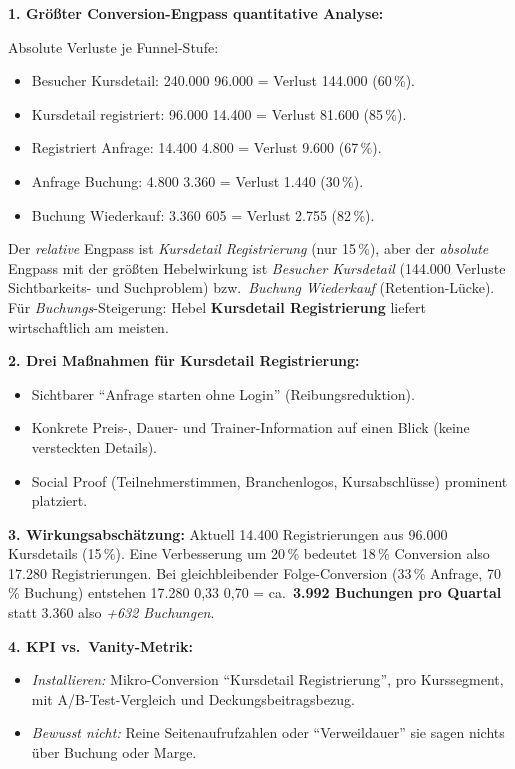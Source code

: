 \documentclass[11pt,a4paper,oneside]{article}
\begin{document}
\begin{loesungbox}
\smallskip
\textbf{1. Größter Conversion-Engpass \textendash{} quantitative Analyse:}

\smallskip
Absolute Verluste je Funnel-Stufe:
\begin{itemize}
  \item Besucher \textrightarrow{} Kursdetail: 240.000 \textrightarrow{} 96.000 = Verlust 144.000 (60\,\%).
  \item Kursdetail \textrightarrow{} registriert: 96.000 \textrightarrow{} 14.400 = Verlust 81.600 (85\,\%).
  \item Registriert \textrightarrow{} Anfrage: 14.400 \textrightarrow{} 4.800 = Verlust 9.600 (67\,\%).
  \item Anfrage \textrightarrow{} Buchung: 4.800 \textrightarrow{} 3.360 = Verlust 1.440 (30\,\%).
  \item Buchung \textrightarrow{} Wiederkauf: 3.360 \textrightarrow{} 605 = Verlust 2.755 (82\,\%).
\end{itemize}

Der \emph{relative} Engpass ist \emph{Kursdetail \textrightarrow{} Registrierung} (nur 15\,\%), aber der \emph{absolute} Engpass mit der größten Hebelwirkung ist \emph{Besucher \textrightarrow{} Kursdetail} (144.000 Verluste \textendash{} Sichtbarkeits- und Suchproblem) bzw.\ \emph{Buchung \textrightarrow{} Wiederkauf} (Retention-Lücke). Für \emph{Buchungs}-Steigerung: Hebel \textbf{Kursdetail \textrightarrow{} Registrierung} liefert wirtschaftlich am meisten.

\smallskip
\textbf{2. Drei Maßnahmen für Kursdetail \textrightarrow{} Registrierung:}
\begin{itemize}
  \item Sichtbarer ``Anfrage starten ohne Login'' (Reibungsreduktion).
  \item Konkrete Preis-, Dauer- und Trainer-Information auf einen Blick (keine versteckten Details).
  \item Social Proof (Teilnehmerstimmen, Branchenlogos, Kursabschlüsse) prominent platziert.
\end{itemize}

\textbf{3. Wirkungsabschätzung:} Aktuell 14.400 Registrierungen aus 96.000 Kursdetails (15\,\%). Eine Verbesserung um 20\,\% bedeutet 18\,\% Conversion \textendash{} also 17.280 Registrierungen. Bei gleichbleibender Folge-Conversion (33\,\% Anfrage, 70\,\% Buchung) entstehen 17.280 \texttimes{} 0{,}33 \texttimes{} 0{,}70 = ca.\ \textbf{3.992 Buchungen pro Quartal} statt 3.360 \textendash{} also \emph{+632 Buchungen}.

\smallskip
\textbf{4. KPI vs.\ Vanity-Metrik:}
\begin{itemize}
  \item \emph{Installieren:} Mikro-Conversion ``Kursdetail \textrightarrow{} Registrierung'', pro Kurssegment, mit A/B-Test-Vergleich und Deckungsbeitragsbezug.
  \item \emph{Bewusst nicht:} Reine Seitenaufrufzahlen oder ``Verweildauer'' \textendash{} sie sagen nichts über Buchung oder Marge.
\end{itemize}
\end{loesungbox}
\end{document}
